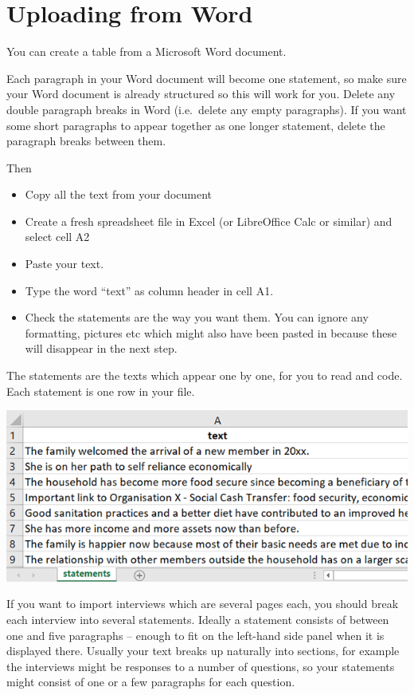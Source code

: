 \documentclass[
]{book}
\providecommand{\tightlist}{%
  \setlength{\itemsep}{0pt}\setlength{\parskip}{0pt}}
\begin{document}
\hypertarget{uploading-from-word}{%
\section{Uploading from Word}\label{uploading-from-word}}

You can create a table from a Microsoft Word document.

Each paragraph in your Word document will become one statement, so make sure your Word document is already structured so this will work for you. Delete any double paragraph breaks in Word (i.e.~delete any empty paragraphs). If you want some short paragraphs to appear together as one longer statement, delete the paragraph breaks between them.

Then

\begin{itemize}
\tightlist
\item
  Copy all the text from your document
\item
  Create a fresh spreadsheet file in Excel (or LibreOffice Calc or similar) and select cell A2
\item
  Paste your text.
\item
  Type the word ``text'' as column header in cell A1.
\item
  Check the statements are the way you want them. You can ignore any formatting, pictures etc which might also have been pasted in because these will disappear in the next step.
\end{itemize}

The statements are the texts which appear one by one, for you to read and code. Each statement is one row in your file.

\includegraphics[width=6.77083in,height=\textheight]{_assets/image-20211018160023515.png}

If you want to import interviews which are several pages each, you should break each interview into several statements. Ideally a statement consists of between one and five paragraphs -- enough to fit on the left-hand side panel when it is displayed there. Usually your text breaks up naturally into sections, for example the interviews might be responses to a number of questions, so your statements might consist of one or a few paragraphs for each question.
\end{document}
